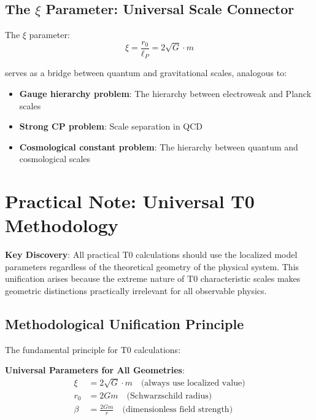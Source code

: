 \documentclass[12pt,a4paper]{article}
\begin{document}
	\subsection{The $\xi$ Parameter: Universal Scale Connector}
	\label{subsec:xi_universal}
	\label{sec:xi_derivation}
	
	The $\xi$ parameter:
	\begin{equation}
		\xi = \frac{r_0}{\ell_P} = 2\sqrt{G} \cdot m
	\end{equation}
	
	serves as a bridge between quantum and gravitational scales, analogous to:
	\begin{itemize}
		\item \textbf{Gauge hierarchy problem}: The hierarchy between electroweak and Planck scales \citep{weinberg1995,susskind1979}
		\item \textbf{Strong CP problem}: Scale separation in QCD \citep{peccei1977,weinberg1978}
		\item \textbf{Cosmological constant problem}: The hierarchy between quantum and cosmological scales \citep{weinberg1989,carroll2001}
	\end{itemize}
	
	\section{Practical Note: Universal T0 Methodology}
	\label{sec:practical_methodology}
	
	\begin{tcolorbox}[colback=green!5!white,colframe=green!75!black,title=Universal T0 Calculation Method]
		\textbf{Key Discovery}: All practical T0 calculations should use the localized model parameters regardless of the theoretical geometry of the physical system. This unification arises because the extreme nature of T0 characteristic scales makes geometric distinctions practically irrelevant for all observable physics.
	\end{tcolorbox}
	
	\subsection{Methodological Unification Principle}
	\label{subsec:methodological_unification}
	
	The fundamental principle for T0 calculations:
	
	\textbf{Universal Parameters for All Geometries}:
	\begin{align}
		\xi &= 2\sqrt{G} \cdot m \quad \text{(always use localized value)} \\
		r_0 &= 2Gm \quad \text{(Schwarzschild radius)} \\
		\beta &= \frac{2Gm}{r} \quad \text{(dimensionless field strength)}
	\end{align}
	
\end{document}
